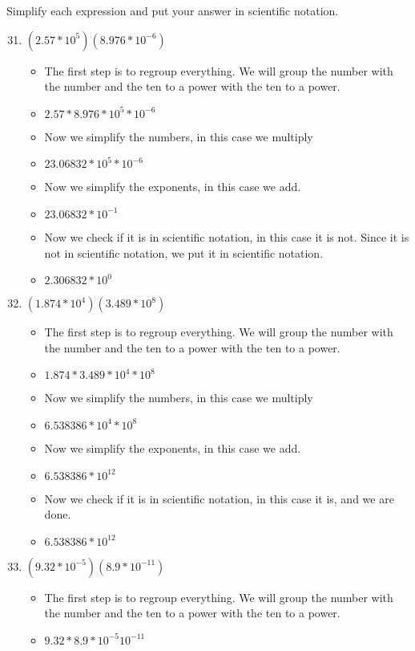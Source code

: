 Simplify each expression and put your answer in scientific notation.
\begin{enumerate}
\setcounter{enumi}{30}
\item $(2.57*10^{5})(8.976*10^{-6})$
  \begin{itemize}
  \item [] The first step is to regroup everything. We will group the number with the number and the ten to a power with the ten to a power.
  \item $2.57*8.976 * 10^{5}*10^{-6}$
  \item [] Now we simplify the numbers, in this case we multiply
  \item $23.06832 * 10^{5}*10^{-6}$
  \item [] Now we simplify the exponents, in this case we add.
  \item $23.06832 * 10^{-1}$
  \item [] Now we check if it is in scientific notation, in this case it is not. Since it is not in scientific notation, we put it in scientific notation.
  \item $2.306832 * 10^{0}$
  \end{itemize}
\item $(1.874*10^{4})(3.489*10^{8})$
  \begin{itemize}
  \item [] The first step is to regroup everything. We will group the number with the number and the ten to a power with the ten to a power.
  \item $1.874*3.489 * 10^{4}*10^{8}$
  \item [] Now we simplify the numbers, in this case we multiply
  \item $6.538386 * 10^{4}*10^{8}$
  \item [] Now we simplify the exponents, in this case we add.
  \item $6.538386 * 10^{12}$
  \item [] Now we check if it is in scientific notation, in this case it is, and we are done.
  \item $6.538386 *10^{12}$
  \end{itemize}
\item $(9.32*10^{-5})(8.9*10^{-11})$
  \begin{itemize}
  \item [] The first step is to regroup everything. We will group the number with the number and the ten to a power with the ten to a power.
  \item $9.32*8.9 * 10^{-5}10^{-11}$

\end{itemize}
\end{enumerate}
